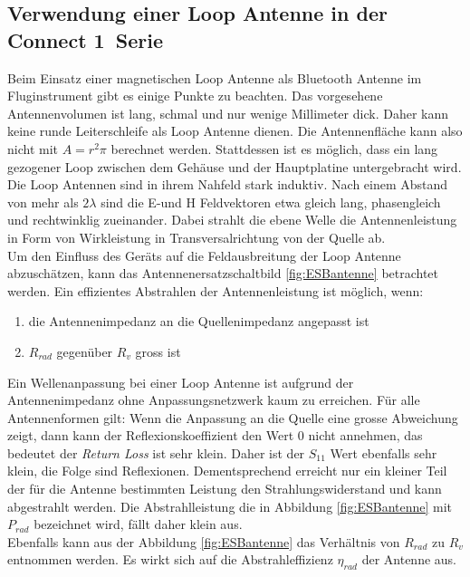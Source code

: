 \subsection{Verwendung einer Loop Antenne in der \glqq Connect 1\grqq \ Serie}
Beim Einsatz einer magnetischen Loop Antenne als Bluetooth Antenne im Fluginstrument gibt es einige Punkte zu beachten. Das vorgesehene Antennenvolumen ist lang, schmal und nur wenige Millimeter dick. Daher kann keine runde Leiterschleife als Loop Antenne dienen. Die Antennenfläche kann also nicht mit $A=r^{2}\pi$ berechnet werden. Stattdessen ist es möglich, dass ein lang gezogener Loop zwischen dem Gehäuse und der Hauptplatine untergebracht wird. Die Loop Antennen sind in ihrem Nahfeld stark induktiv. Nach einem Abstand von mehr als $2\lambda$ sind die E-und H Feldvektoren etwa gleich lang, phasengleich und rechtwinklig zueinander. Dabei strahlt die ebene Welle die Antennenleistung in Form von Wirkleistung in Transversalrichtung von der Quelle ab.\\
Um den Einfluss des Geräts auf die Feldausbreitung der Loop Antenne abzuschätzen, kann das Antennenersatzschaltbild \ref{fig:ESBantenne} betrachtet werden. Ein effizientes Abstrahlen der Antennenleistung ist möglich, wenn:
 \begin{enumerate}[label={\alph*)}] 
 \item die Antennenimpedanz an die Quellenimpedanz angepasst ist 
 \item $R_{rad}$ gegenüber $R_{v}$ gross ist 
 \end{enumerate} 
Ein Wellenanpassung bei einer Loop Antenne ist aufgrund der Antennenimpedanz ohne Anpassungsnetzwerk kaum zu erreichen. Für alle Antennenformen gilt: Wenn die Anpassung an die Quelle eine grosse Abweichung zeigt, dann kann der Reflexionskoeffizient den Wert 0 nicht annehmen, das bedeutet der \textit{Return Loss} ist sehr klein. Daher ist der $S_{11}$ Wert ebenfalls sehr klein, die Folge sind Reflexionen. 
Dementsprechend erreicht nur ein kleiner Teil der für die Antenne bestimmten Leistung den Strahlungswiderstand und kann abgestrahlt werden. Die Abstrahlleistung die in Abbildung \ref{fig:ESBantenne} mit $P_{rad}$ bezeichnet wird, fällt daher klein aus.\\
Ebenfalls kann aus der Abbildung \ref{fig:ESBantenne} das Verhältnis von $R_{rad}$ zu $R_{v}$ entnommen werden. Es wirkt sich auf die Abstrahleffizienz $\eta_{rad}$ der Antenne aus.

